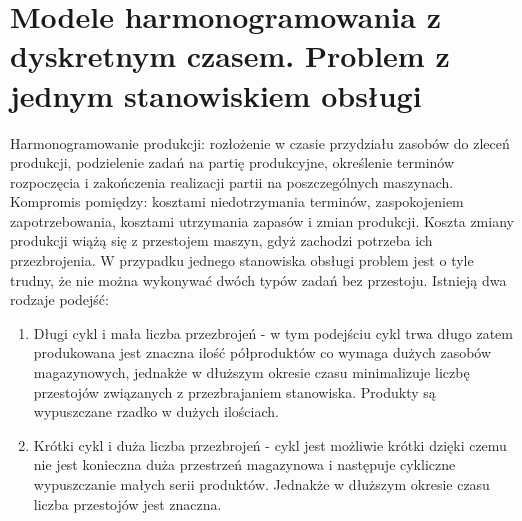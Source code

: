 \section{Modele harmonogramowania z dyskretnym czasem. Problem z jednym stanowiskiem obsługi}
Harmonogramowanie produkcji: rozłożenie w czasie przydziału zasobów do zleceń produkcji, podzielenie zadań na partię produkcyjne, określenie terminów rozpoczęcia i zakończenia realizacji partii na poszczególnych maszynach. Kompromis pomiędzy: kosztami niedotrzymania terminów, zaspokojeniem zapotrzebowania, kosztami utrzymania zapasów i zmian produkcji. 
Koszta zmiany produkcji wiążą się z przestojem maszyn, gdyż zachodzi potrzeba ich przezbrojenia.
W przypadku jednego stanowiska obsługi problem jest o tyle trudny, że nie można wykonywać dwóch typów zadań
bez przestoju. Istnieją dwa rodzaje podejść:
\begin{enumerate}
	\item Długi cykl i mała liczba przezbrojeń - w tym podejściu cykl trwa długo zatem produkowana jest znaczna ilość
	półproduktów co wymaga dużych zasobów magazynowych, jednakże w dłuższym okresie czasu minimalizuje liczbę przestojów 
	związanych z przezbrajaniem stanowiska. Produkty są wypuszczane rzadko w dużych ilościach.
	\item Krótki cykl i duża liczba przezbrojeń - cykl jest możliwie krótki dzięki czemu nie jest konieczna duża przestrzeń
	magazynowa i następuje cykliczne wypuszczanie małych serii produktów. Jednakże w dłuższym okresie czasu liczba 
	przestojów jest znaczna.
\end{enumerate}